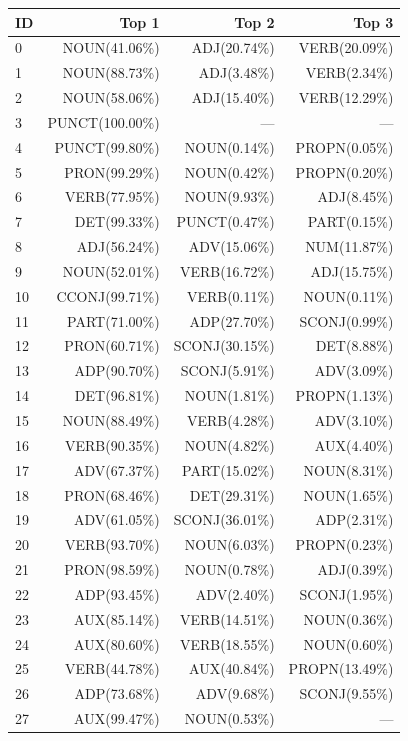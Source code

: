 \begin{table}[htbp]
\centering
\small
\tabcolsep 2pt
\begin{tabular}{lrrr}
\toprule
ID & Top 1 & Top 2 & Top 3\\
\midrule
0& NOUN(41.06\%)& ADJ(20.74\%)& VERB(20.09\%)\\
1& NOUN(88.73\%)& ADJ(3.48\%)& VERB(2.34\%)\\
2& NOUN(58.06\%)& ADJ(15.40\%)& VERB(12.29\%)\\
3& PUNCT(100.00\%)& ---& ---\\
4& PUNCT(99.80\%)& NOUN(0.14\%)& PROPN(0.05\%)\\
5& PRON(99.29\%)& NOUN(0.42\%)& PROPN(0.20\%)\\
6& VERB(77.95\%)& NOUN(9.93\%)& ADJ(8.45\%)\\
7& DET(99.33\%)& PUNCT(0.47\%)& PART(0.15\%)\\
8& ADJ(56.24\%)& ADV(15.06\%)& NUM(11.87\%)\\
9& NOUN(52.01\%)& VERB(16.72\%)& ADJ(15.75\%)\\
10& CCONJ(99.71\%)& VERB(0.11\%)& NOUN(0.11\%)\\
11& PART(71.00\%)& ADP(27.70\%)& SCONJ(0.99\%)\\
12& PRON(60.71\%)& SCONJ(30.15\%)& DET(8.88\%)\\
13& ADP(90.70\%)& SCONJ(5.91\%)& ADV(3.09\%)\\
14& DET(96.81\%)& NOUN(1.81\%)& PROPN(1.13\%)\\
15& NOUN(88.49\%)& VERB(4.28\%)& ADV(3.10\%)\\
16& VERB(90.35\%)& NOUN(4.82\%)& AUX(4.40\%)\\
17& ADV(67.37\%)& PART(15.02\%)& NOUN(8.31\%)\\
18& PRON(68.46\%)& DET(29.31\%)& NOUN(1.65\%)\\
19& ADV(61.05\%)& SCONJ(36.01\%)& ADP(2.31\%)\\
20& VERB(93.70\%)& NOUN(6.03\%)& PROPN(0.23\%)\\
21& PRON(98.59\%)& NOUN(0.78\%)& ADJ(0.39\%)\\
22& ADP(93.45\%)& ADV(2.40\%)& SCONJ(1.95\%)\\
23& AUX(85.14\%)& VERB(14.51\%)& NOUN(0.36\%)\\
24& AUX(80.60\%)& VERB(18.55\%)& NOUN(0.60\%)\\
25& VERB(44.78\%)& AUX(40.84\%)& PROPN(13.49\%)\\
26& ADP(73.68\%)& ADV(9.68\%)& SCONJ(9.55\%)\\
27& AUX(99.47\%)& NOUN(0.53\%)& ---\\

\end{tabular}
\end{table}
